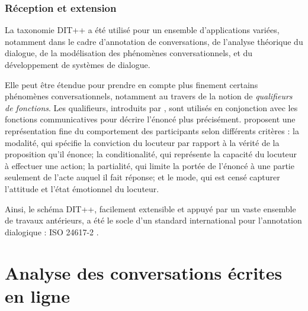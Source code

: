 \documentclass[10pt,a4paper,twoside]{article}
\begin{document}


\subsubsection{Réception et extension}

La taxonomie DIT++ a été utilisé pour un ensemble d'applications variées, notamment dans le cadre d'annotation de conversations, de l'analyse théorique du dialogue, de la modélisation des phénomènes conversationnels, et du développement de systèmes de dialogue. 

Elle peut être étendue pour prendre en compte plus finement certains phénomènes conversationnels, notamment au travers de la notion de \textit{qualifieurs de fonctions}. Les qualifieurs, introduits par \citet{petukhova2010introducing}, sont utilisés en conjonction avec les fonctions communicatives pour décrire l'énoncé plus précisément. \citeauthor{petukhova2010introducing} proposent une représentation fine du comportement des participants selon différents critères : la modalité, qui spécifie la conviction du locuteur par rapport à la vérité de la proposition qu'il énonce; la conditionalité, qui représente la capacité du locuteur à effectuer une action; la partialité, qui limite la portée de l'énoncé à une partie seulement de l'acte auquel il fait réponse; et le mode, qui est censé capturer l'attitude et l'état émotionnel du locuteur.

Ainsi, le schéma DIT++, facilement extensible et appuyé par un vaste ensemble de travaux antérieurs, a été le socle d'un standard international pour l'annotation dialogique : ISO 24617-2 \cite{bunt2012iso}.

\section{Analyse des conversations écrites en ligne}
\label{sec:online_written_conversation_analysis}
\end{document}
